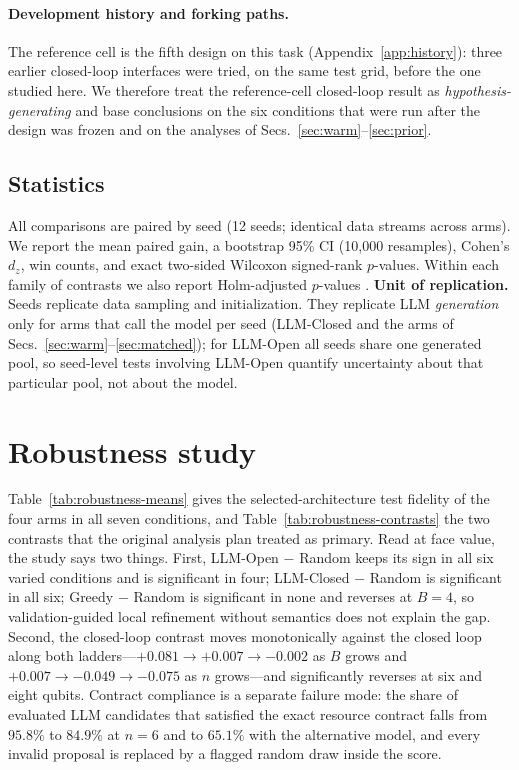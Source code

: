 \documentclass[11pt]{article}
\begin{document}
\paragraph{Development history and forking paths.}
The reference cell is the fifth design on this task (Appendix~\ref{app:history}): three
earlier closed-loop interfaces were tried, on the same test grid, before the one
studied here. We therefore treat the reference-cell closed-loop result as
\emph{hypothesis-generating} and base conclusions on the six conditions that were run
after the design was frozen and on the analyses of Secs.~\ref{sec:warm}--\ref{sec:prior}.

\subsection{Statistics}

All comparisons are paired by seed (12 seeds; identical data streams across arms).
We report the mean paired gain, a bootstrap 95\% CI (10{,}000 resamples), Cohen's
$d_z$, win counts, and exact two-sided Wilcoxon signed-rank $p$-values.
Within each family of contrasts we also report Holm-adjusted $p$-values
\cite{holm1979simple}.
\textbf{Unit of replication.} Seeds replicate data sampling and initialization. They
replicate LLM \emph{generation} only for arms that call the model per seed
(LLM-Closed and the arms of Secs.~\ref{sec:warm}--\ref{sec:matched}); for LLM-Open all
seeds share one generated pool, so seed-level tests involving LLM-Open quantify
uncertainty about that particular pool, not about the model.

\section{Robustness study}
\label{sec:robustness}

Table~\ref{tab:robustness-means} gives the selected-architecture test fidelity of
the four arms in all seven conditions, and Table~\ref{tab:robustness-contrasts} the
two contrasts that the original analysis plan treated as primary.
Read at face value, the study says two things.
First, LLM-Open $-$ Random keeps its sign in all six varied conditions and is
significant in four; LLM-Closed $-$ Random is significant in all six; Greedy $-$ Random
is significant in none and reverses at $B=4$, so validation-guided local refinement
without semantics does not explain the gap.
Second, the closed-loop contrast moves monotonically against the closed loop along
both ladders---$+0.081\to+0.007\to-0.002$ as $B$ grows and $+0.007\to-0.049\to-0.075$ as
$n$ grows---and significantly reverses at six and eight qubits.
Contract compliance is a separate failure mode: the share of evaluated LLM candidates
that satisfied the exact resource contract falls from $95.8\%$ to $84.9\%$ at $n=6$ and
to $65.1\%$ with the alternative model, and every invalid proposal is replaced by a
flagged random draw inside the score.
\end{document}
